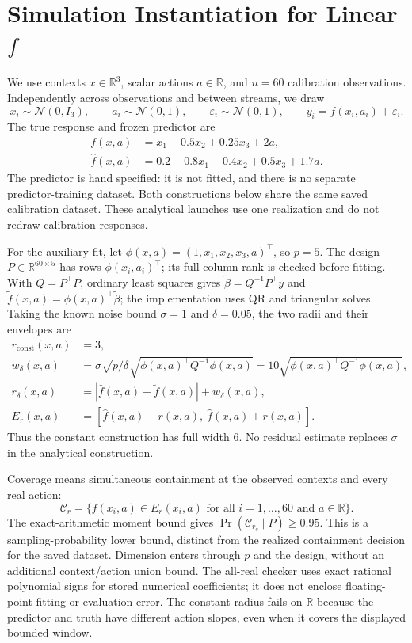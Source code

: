\documentclass[11pt]{article}
\begin{document}
\section{Simulation Instantiation for Linear $f$}

We use contexts $x\in\mathbb R^3$, scalar actions $a\in\mathbb R$, and
$n=60$ calibration observations. Independently across observations and between
streams, we draw
\[
 x_i\sim\mathcal N(0,I_3),\qquad a_i\sim\mathcal N(0,1),\qquad
 \varepsilon_i\sim\mathcal N(0,1),\qquad
 y_i=f(x_i,a_i)+\varepsilon_i.
\]
The true response and frozen predictor are
\begin{align*}
 f(x,a)&=x_1-0.5x_2+0.25x_3+2a,\\
 \widehat f(x,a)&=0.2+0.8x_1-0.4x_2+0.5x_3+1.7a.
\end{align*}
The predictor is hand specified: it is not fitted, and there is no separate
predictor-training dataset. Both constructions below share the same saved
calibration dataset. These analytical launches use one realization and do not
redraw calibration responses.

For the auxiliary fit, let $\phi(x,a)=(1,x_1,x_2,x_3,a)^\top$, so $p=5$.
The design $P\in\mathbb R^{60\times5}$ has rows $\phi(x_i,a_i)^\top$;
its full column rank is checked before fitting. With $Q=P^\top P$, ordinary
least squares gives $\widetilde\beta=Q^{-1}P^\top y$ and
$\widetilde f(x,a)=\phi(x,a)^\top\widetilde\beta$; the implementation uses
QR and triangular solves. Taking the known noise bound $\sigma=1$ and
$\delta=0.05$, the two radii and their envelopes are
\begin{align*}
 r_{\mathrm{const}}(x,a)&=3,\\
 w_\delta(x,a)&=\sigma\sqrt{p/\delta}
       \sqrt{\phi(x,a)^\top Q^{-1}\phi(x,a)}
       =10\sqrt{\phi(x,a)^\top Q^{-1}\phi(x,a)},\\
 r_\delta(x,a)&=|\widehat f(x,a)-\widetilde f(x,a)|+w_\delta(x,a),\\
 E_r(x,a)&=[\widehat f(x,a)-r(x,a),\ \widehat f(x,a)+r(x,a)].
\end{align*}
Thus the constant construction has full width $6$. No residual estimate
replaces $\sigma$ in the analytical construction.

Coverage means simultaneous containment at the observed contexts and every
real action:
\[
 \mathcal C_r=\{f(x_i,a)\in E_r(x_i,a)
                 \text{ for all }i=1,\ldots,60\text{ and }a\in\mathbb R\}.
\]
The exact-arithmetic moment bound gives $\Pr(\mathcal C_{r_\delta}\mid P)\ge0.95$.
This is a sampling-probability lower bound, distinct from the realized
containment decision for the saved dataset. Dimension enters through $p$ and
the design, without an additional context/action union bound. The all-real
checker uses exact rational polynomial signs for stored numerical coefficients;
it does not enclose floating-point fitting or evaluation error. The constant radius fails
on $\mathbb R$ because the predictor and truth have different action slopes,
even when it covers the displayed bounded window.
\end{document}
